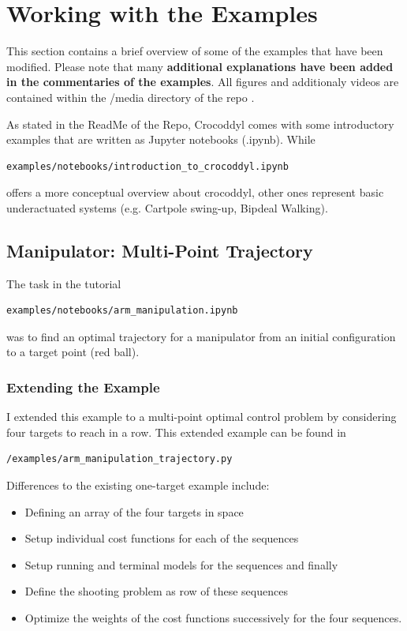 \section{Working with the Examples}
This section contains a brief overview of some of the examples that have been modified. Please note that many \textbf{additional explanations have been added in the commentaries of the examples}. All figures and additionaly videos are contained within the /media directory of the repo \cite{julesserOCFrameworks}. 

As stated in the ReadMe of the Repo, Crocoddyl comes with some introductory examples that are written as Jupyter notebooks (.ipynb). While 
\begin{verbatim}
examples/notebooks/introduction_to_crocoddyl.ipynb
\end{verbatim}
offers a more conceptual overview about crocoddyl, other ones represent basic underactuated systems (e.g. Cartpole swing-up, Bipdeal Walking).

\subsection{Manipulator: Multi-Point Trajectory}
The task in the tutorial
\begin{verbatim}
examples/notebooks/arm_manipulation.ipynb
\end{verbatim}
was to find an optimal trajectory for a manipulator from an initial configuration to a target point (red ball). 
\subsubsection{Extending the Example}
I extended this example to a multi-point optimal control problem by considering four targets to reach in a row. This extended example can be found in 
\begin{verbatim}
/examples/arm_manipulation_trajectory.py
\end{verbatim}
Differences to the existing one-target example include:
\begin{itemize}
\item Defining an array of the four targets in space
\item Setup individual cost functions for each of the sequences
\item Setup running and terminal models for the sequences and finally
\item Define the shooting problem as row of these sequences 
\item Optimize the weights of the cost functions successively for the four sequences.
\end{itemize}
